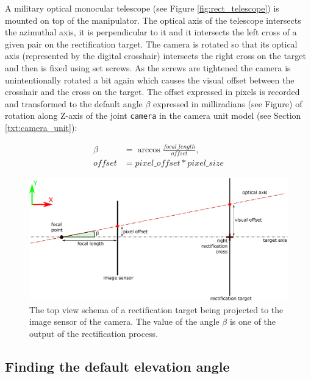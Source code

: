 A military optical monocular telescope (see Figure \ref{fig:rect_telescope}) is mounted on top of the manipulator. The optical axis of the telescope intersects the azimuthal axis, it is perpendicular to it and it intersects the left cross of a given pair on the rectification target. The camera is rotated so that its optical axis (represented by the digital crosshair) intersects the right cross on the target and then is fixed using set screws. As the screws are tightened the camera is unintentionally rotated a bit again which causes the visual offset between the crosshair and the cross on the target. The offset expressed in pixels is recorded and transformed to the default angle $\beta$ expressed in milliradians (see Figure) of rotation along Z-axis of the joint \texttt{camera} in the camera unit model (see Section \ref{txt:camera_unit}):

\begin{equation*}
\begin{aligned}
\beta &= \arccos\frac{focal\_length}{offset}, \\
offset &= pixel\_offset * pixel\_size
\end{aligned}
\end{equation*}

\begin{figure}[htb]
	\centering
	\includegraphics[width=13cm]{fig/rect_pixel_offset.pdf}
	\caption{The top view schema of a rectification target being projected to the image sensor of the camera. The value of the angle $\beta$ is one of the output of the rectification process.}
	\label{fig:rect_pixel_offset}
\end{figure}

\subsection{Finding the default elevation angle}

